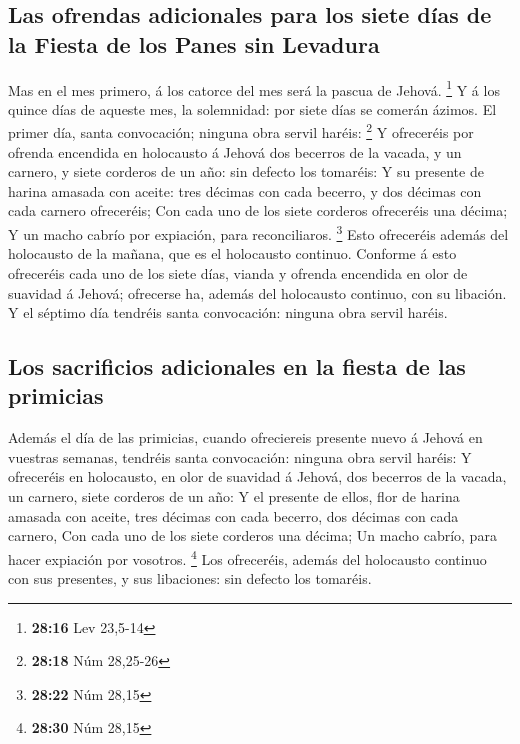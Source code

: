 \hypertarget{las-ofrendas-adicionales-para-los-siete-duxedas-de-la-fiesta-de-los-panes-sin-levadura}{%
\subsection{Las ofrendas adicionales para los siete días de la Fiesta de
los Panes sin
Levadura}\label{las-ofrendas-adicionales-para-los-siete-duxedas-de-la-fiesta-de-los-panes-sin-levadura}}

 Mas en el mes primero, á los catorce del mes será la
pascua de Jehová. \footnote{\textbf{28:16} Lev 23,5-14} 
Y á los quince días de aqueste mes, la solemnidad: por siete días se
comerán ázimos.  El primer día, santa convocación;
ninguna obra servil haréis: \footnote{\textbf{28:18} Núm 28,25-26}
 Y ofreceréis por ofrenda encendida en holocausto á
Jehová dos becerros de la vacada, y un carnero, y siete corderos de un
año: sin defecto los tomaréis:  Y su presente de harina
amasada con aceite: tres décimas con cada becerro, y dos décimas con
cada carnero ofreceréis;  Con cada uno de los siete
corderos ofreceréis una décima;  Y un macho cabrío por
expiación, para reconciliaros. \footnote{\textbf{28:22} Núm 28,15}
 Esto ofreceréis además del holocausto de la mañana, que
es el holocausto continuo.  Conforme á esto ofreceréis
cada uno de los siete días, vianda y ofrenda encendida en olor de
suavidad á Jehová; ofrecerse ha, además del holocausto continuo, con su
libación.  Y el séptimo día tendréis santa convocación:
ninguna obra servil haréis.

\hypertarget{los-sacrificios-adicionales-en-la-fiesta-de-las-primicias}{%
\subsection{Los sacrificios adicionales en la fiesta de las
primicias}\label{los-sacrificios-adicionales-en-la-fiesta-de-las-primicias}}

 Además el día de las primicias, cuando ofreciereis
presente nuevo á Jehová en vuestras semanas, tendréis santa convocación:
ninguna obra servil haréis:  Y ofreceréis en holocausto,
en olor de suavidad á Jehová, dos becerros de la vacada, un carnero,
siete corderos de un año:  Y el presente de ellos, flor
de harina amasada con aceite, tres décimas con cada becerro, dos décimas
con cada carnero,  Con cada uno de los siete corderos una
décima;  Un macho cabrío, para hacer expiación por
vosotros. \footnote{\textbf{28:30} Núm 28,15}  Los
ofreceréis, además del holocausto continuo con sus presentes, y sus
libaciones: sin defecto los tomaréis.

